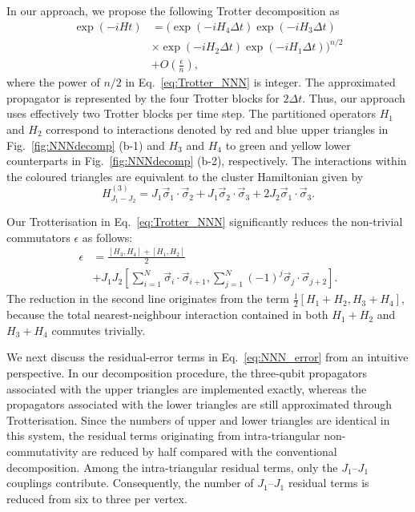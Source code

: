 \documentclass[aps,showpacs,amsmath,amssymb,twocolumn,prx,longbibliography,superscriptaddress,notitlepage,floatfix,10pt]{revtex4-2}
\begin{document}
In our approach, we propose the following Trotter decomposition as
\begin{equation}
\begin{split}
    \exp(-iHt)&=\bigl(\exp(-iH_{4}\Delta t)\exp(-iH_{3}\Delta t)\\\quad&\times\exp(-iH_{2}\Delta t)\exp(-iH_{1}\Delta t)\bigr)^{n/2}\\
    \quad &+O\left(\frac{\epsilon}{n}\right),\label{eq:Trotter_NNN}
\end{split}
\end{equation}
where the power of $n/2$ in Eq.~\eqref{eq:Trotter_NNN} is integer. The approximated propagator is represented by the four Trotter blocks for $2\Delta t$. Thus, our approach uses effectively two Trotter blocks per time step.
The partitioned operators $H_{1}$ and $H_{2}$ correspond to interactions denoted by red and blue upper triangles in Fig.~\ref{fig:NNNdecomp} (b-1) and $H_{3}$ and $H_{4}$ to green and yellow lower counterparts in Fig.~\ref{fig:NNNdecomp} (b-2), respectively. The interactions within the coloured triangles are equivalent to the cluster Hamiltonian given by
\begin{equation}
 H_{J_{1}-J_{2}}^{(3)}=J_{1}\vec{\sigma}_{1}\cdot\vec{\sigma}_{2}+J_{1}\vec{\sigma}_{2}\cdot\vec{\sigma}_{3}+2J_{2}\vec{\sigma}_{1}\cdot\vec{\sigma}_{3}   .
\end{equation}

Our Trotterisation in Eq.~\eqref{eq:Trotter_NNN} significantly reduces the non-trivial commutators $\epsilon$ as follows: 
\begin{equation} 
\begin{split} 
\epsilon&=\frac{[H_{3},H_{4}]+[H_{1},H_{2}]}{2}\\ &+J_{1}J_{2}\left[\sum_{i=1}^{N}\vec{\sigma}_{i}\cdot\vec{\sigma}_{i+1},\sum_{j=1}^{N}(-1)^j\vec{\sigma}_{j}\cdot\vec{\sigma}_{j+2}\right].\label{eq:NNN_error} 
\end{split} 
\end{equation}
The reduction in the second line originates from the term $\frac{1}{2}[H_{1}+H_{2},H_{3}+H_{4}]$,
because the total nearest-neighbour interaction contained in both $H_{1}+H_{2}$ and $H_{3}+H_{4}$ commutes trivially.

We next discuss the residual-error terms in Eq.~\eqref{eq:NNN_error} from an intuitive perspective. 
In our decomposition procedure, the three-qubit propagators associated with the upper triangles are implemented exactly, whereas the propagators associated with the lower triangles are still approximated through Trotterisation. 
Since the numbers of upper and lower triangles are identical in this system, the residual terms originating from intra-triangular non-commutativity are reduced by half compared with the conventional decomposition.
Among the intra-triangular residual terms, only the $J_{1}$--$J_{1}$ couplings contribute. 
Consequently, the number of $J_{1}$--$J_{1}$ residual terms is reduced from six to three per vertex.
\end{document}
